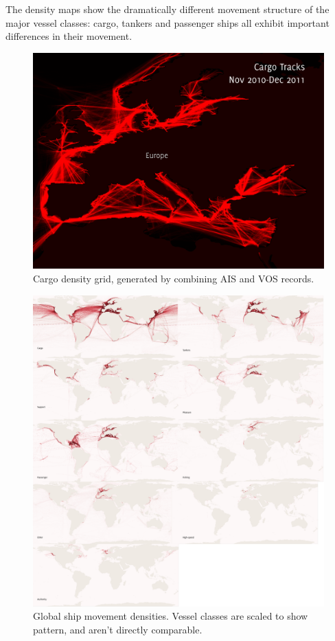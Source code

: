 The density maps show the dramatically different movement structure of the major vessel classes: cargo, tankers and passenger ships all exhibit important differences in their movement.  %

\begin{figure}[h!]
  \centering
    \includegraphics[width=140mm]{figures/cargo-lanes-eu-red-labeled.pdf}
  \caption[Cargo density, Europe]{Cargo density grid, generated by combining AIS and VOS records.}
  \label{fig:eu-cargo-density}
\end{figure}

\begin{figure}[ht]
  \centering
    \includegraphics[width=160mm]{figures/9fold-map-labeled-2x5.pdf}
  \caption[Ship movement densities]{Global ship movement densities. Vessel classes are scaled to show pattern, and aren't directly comparable.}
  \label{fig:9fold-ship-maps}
\end{figure}



